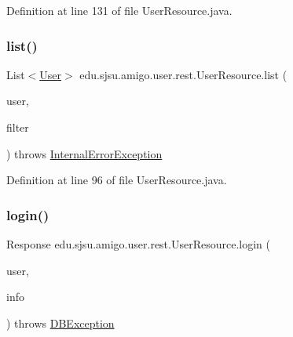 Definition at line 131 of file User\+Resource.\+java.

\mbox{\label{classedu_1_1sjsu_1_1amigo_1_1user_1_1rest_1_1_user_resource_a37d0c5cd46db2da2d2d73c5eb759cbd2}} 
\subsubsection{\texorpdfstring{list()}{list()}}
{\footnotesize\ttfamily List$<$\hyperlink{classedu_1_1sjsu_1_1amigo_1_1user_1_1db_1_1model_1_1_user}{User}$>$ edu.\+sjsu.\+amigo.\+user.\+rest.\+User\+Resource.\+list (\begin{DoxyParamCaption}\item[{@Auth \hyperlink{classedu_1_1sjsu_1_1amigo_1_1user_1_1auth_1_1_principal_user}{Principal\+User}}]{user,  }\item[{@Query\+Param(\char`\"{}filter\char`\"{}) String}]{filter }\end{DoxyParamCaption}) throws \hyperlink{classedu_1_1sjsu_1_1amigo_1_1user_1_1rest_1_1_internal_error_exception}{Internal\+Error\+Exception}}



Definition at line 96 of file User\+Resource.\+java.

\mbox{\label{classedu_1_1sjsu_1_1amigo_1_1user_1_1rest_1_1_user_resource_af9c68d9343542ae9c68cb6d98c8d1659}} 
\subsubsection{\texorpdfstring{login()}{login()}}
{\footnotesize\ttfamily Response edu.\+sjsu.\+amigo.\+user.\+rest.\+User\+Resource.\+login (\begin{DoxyParamCaption}\item[{@Auth \hyperlink{classedu_1_1sjsu_1_1amigo_1_1user_1_1db_1_1model_1_1_user}{User}}]{user,  }\item[{@Context Uri\+Info}]{info }\end{DoxyParamCaption}) throws \hyperlink{classedu_1_1sjsu_1_1amigo_1_1db_1_1common_1_1_d_b_exception}{D\+B\+Exception}}

